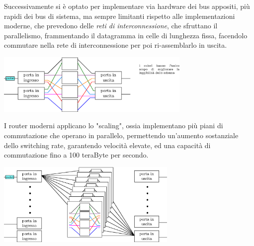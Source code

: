 \documentclass[12pt, letterpaper]{article}
\begin{document}
Successivamente si è optato per implementare via hardware dei bus appositi, più rapidi dei bus di sistema, ma sempre 
limitanti rispetto alle implementazioni moderne, che prevedono delle \textit{reti di interconnessione},
che sfruttano il parallelismo, frammentando il datagramma in celle di lunghezza fissa, facendolo commutare nella rete 
di interconnessione per poi ri-assemblarlo in uscita.\begin{center}
    \includegraphics[width=0.7\textwidth ]{images/fabricInterconnesso.eps}
\end{center}
I router moderni applicano lo "scaling", ossia implementano più piani di commutazione che operano in parallelo, permettendo 
un'aumento sostanziale dello switching rate, garantendo velocità elevate, ed una capacità di commutazione 
fino a 100 teraByte per secondo.\begin{center}
    \includegraphics[width=0.65\textwidth ]{images/fabricParallelo.eps}
\end{center}
\end{document}
